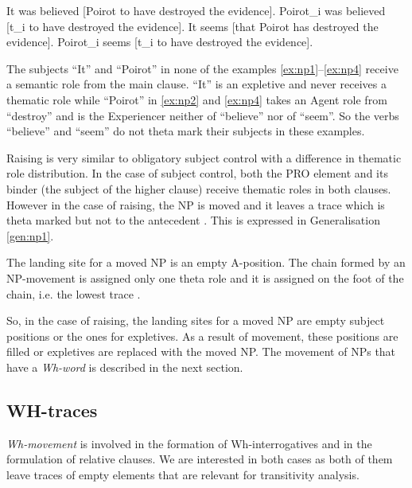     \begin{exe}
    	\ex\label{ex:np1} It was believed [Poirot to have destroyed the evidence].
    	\ex\label{ex:np2} Poirot_{i} was believed [t_{i} to have destroyed the evidence].
    	\ex\label{ex:np3} It seems [that Poirot has destroyed the evidence].
    	\ex\label{ex:np4} Poirot_{i} seems [t_{i} to have destroyed the evidence].
    \end{exe}

    The subjects ``It'' and ``Poirot'' in none of the examples \ref{ex:np1}--\ref{ex:np4} receive a semantic role from the main clause. ``It'' is an expletive and never receives a thematic role while ``Poirot'' in \ref{ex:np2} and \ref{ex:np4} takes an Agent role from ``destroy'' and is the Experiencer neither of ``believe'' nor of ``seem''. So the verbs ``believe'' and ``seem'' do not theta mark their subjects in these examples.

    Raising is very similar to obligatory subject control with a difference in thematic role distribution. In the case of subject control, both the PRO element and its binder (the subject of the higher clause) receive thematic roles in both clauses. However in the case of raising, the NP is moved and it leaves a trace which is theta marked but not to the antecedent \citep[314]{Haegeman1991}. This is expressed in Generalisation \ref{gen:np1}. 

    \begin{generalization}\label{gen:np1} 
    	The landing site for a moved NP is an empty A-position. The chain formed by an NP-movement is assigned only one theta role and it is assigned on the foot of the chain, i.e. the lowest trace \citep[314]{Haegeman1991}.
    \end{generalization} 

    So, in the case of raising, the landing sites for a moved NP are empty subject positions or the ones for expletives. As a result of movement, these positions are filled or expletives are replaced with the moved NP. The movement of NPs that have a \textit{Wh-word} is described in the next section.

\subsection{WH-traces}
\label{sec:wh-gbt}
    \textit{Wh-movement} is involved in the formation of Wh-interrogatives and in the formulation of relative clauses. We are interested in both cases as both of them leave traces of empty elements that are relevant for transitivity analysis.  

